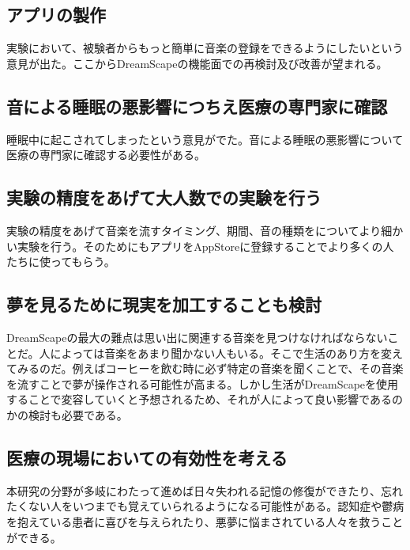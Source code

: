 \subsection{アプリの製作}
実験において、被験者からもっと簡単に音楽の登録をできるようにしたいという意見が出た。ここからDreamScapeの機能面での再検討及び改善が望まれる。

\subsection{音による睡眠の悪影響につちえ医療の専門家に確認}
睡眠中に起こされてしまったという意見がでた。音による睡眠の悪影響について医療の専門家に確認する必要性がある。

\subsection{実験の精度をあげて大人数での実験を行う}
実験の精度をあげて音楽を流すタイミング、期間、音の種類をについてより細かい実験を行う。そのためにもアプリをAppStoreに登録することでより多くの人たちに使ってもらう。

\subsection{夢を見るために現実を加工することも検討}
DreamScapeの最大の難点は思い出に関連する音楽を見つけなければならないことだ。人によっては音楽をあまり聞かない人もいる。そこで生活のあり方を変えてみるのだ。例えばコーヒーを飲む時に必ず特定の音楽を聞くことで、その音楽を流すことで夢が操作される可能性が高まる。しかし生活がDreamScapeを使用することで変容していくと予想されるため、それが人によって良い影響であるのかの検討も必要である。

\subsection{医療の現場においての有効性を考える}
本研究の分野が多岐にわたって進めば日々失われる記憶の修復ができたり、忘れたくない人をいつまでも覚えていられるようになる可能性がある。認知症や鬱病を抱えている患者に喜びを与えられたり、悪夢に悩まされている人々を救うことができる。
